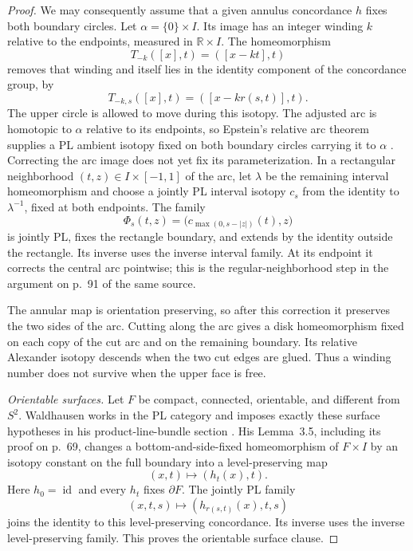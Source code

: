 \begin{proof}
We may consequently assume that a given annulus concordance $h$ fixes
both boundary circles.  Let $\alpha=\{0\}\times I$.  Its image has an
integer winding $k$ relative to the endpoints, measured in
$\mathbb R\times I$.  The homeomorphism
\[
                   T_{-k}([x],t)=([x-kt],t)
\]
removes that winding and itself lies in the identity component of the
concordance group, by
\[
                   T_{-k,s}([x],t)=([x-kr(s,t)],t).
\]
The upper circle is allowed to move during this isotopy.  The adjusted
arc is homotopic to $\alpha$ relative to its endpoints, so Epstein's
relative arc theorem supplies a PL ambient isotopy fixed on both
boundary circles carrying it to $\alpha$
\cite[Theorem~3.1 and proof, pp.~89--90]{Epstein1966}.
Correcting the arc image does not yet fix its parameterization.
In a rectangular neighborhood $(t,z)\in I\times[-1,1]$ of the arc,
let $\lambda$ be the remaining interval homeomorphism and choose
a jointly PL interval isotopy $c_s$ from the identity to
$\lambda^{-1}$, fixed at both endpoints. The family
\[
 \Phi_s(t,z)=\bigl(c_{\max(0,s-|z|)}(t),z\bigr)
\]
is jointly PL, fixes the rectangle boundary, and extends by the
identity outside the rectangle. Its inverse uses the inverse
interval family. At its endpoint it corrects the central arc
pointwise; this is the regular-neighborhood step in the argument
on p.~91 of the same source.

The annular map is orientation preserving, so after this correction
it preserves the two sides of the arc. Cutting along the arc gives
a disk homeomorphism fixed on each copy of the cut arc and on the
remaining boundary. Its relative Alexander isotopy descends when
the two cut edges are glued. Thus a winding number does not survive
when the upper face is free.

\emph{Orientable surfaces.}
Let $F$ be compact, connected, orientable, and different from $S^2$.
Waldhausen works in the PL category and imposes exactly these surface
hypotheses in his product-line-bundle section
\cite[pp.~56 and~65]{Waldhausen1968}.
His Lemma~3.5, including its proof on p.~69, changes a
bottom-and-side-fixed homeomorphism of $F\times I$ by an isotopy
constant on the full boundary into a level-preserving map
\[
                         (x,t)\longmapsto(h_t(x),t).
\]
Here $h_0=\operatorname{id}$ and every $h_t$ fixes $\partial F$.
The jointly PL family
\[
                         (x,t,s)\longmapsto(h_{r(s,t)}(x),t,s)
\]
joins the identity to this level-preserving concordance.  Its inverse
uses the inverse level-preserving family.  This proves the orientable
surface clause.


\end{proof}
